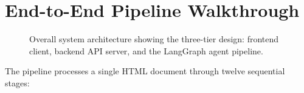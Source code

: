 \section{End-to-End Pipeline Walkthrough}
\label{sec:pipeline-walkthrough}

\begin{figure}[htbp]
  \centering
  \caption{Overall system architecture showing the three-tier design: frontend client, backend API server, and the LangGraph agent pipeline.}
  \label{fig:system-architecture}
\end{figure}

The \versimux{} pipeline processes a single HTML document through twelve sequential stages:

